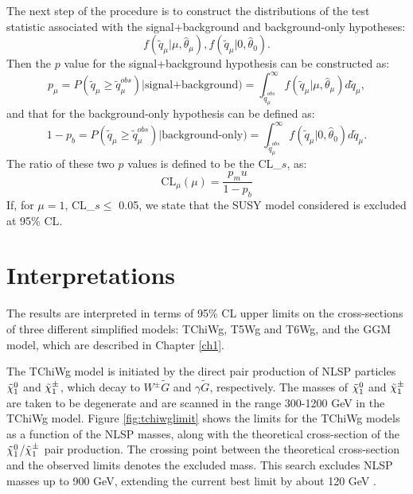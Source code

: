 \documentclass[thesis.tex]{subfiles}
\renewcommand\_{\textunderscore\allowbreak}
\begin{document}
The next step of the procedure is to construct the distributions of the test statistic associated with the signal+background and background-only hypotheses: 
\begin{equation}
	f( \tilde{q}_\mu | \mu, \hat{\theta}_\mu), f( \tilde{q}_\mu | 0, \hat{\theta}_0).
\end{equation}
Then the $p$ value for the signal+background hypothesis can be constructed as:
\begin{equation}
	p_\mu = P( \tilde{q}_\mu \ge \tilde{q}_\mu^{obs}) | \text{signal+background}) = \int_{ \tilde{q}_\mu^{obs}}^\infty f( \tilde{q}_\mu | \mu, \hat{\theta}_\mu) d \tilde{q}_\mu,
\end{equation}
and that for the background-only hypothesis can be defined as:
\begin{equation}
	1- p_b = P( \tilde{q}_\mu \ge \tilde{q}_\mu^{obs}) | \text{background-only}) = \int_{ \tilde{q}_\mu^{obs}}^\infty f( \tilde{q}_\mu | 0, \hat{\theta}_0) d \tilde{q}_\mu. 
\end{equation}
The ratio of these two $p$ values is defined to be the CL_$s$, as:
\begin{equation}
	\text{CL}_\mu(\mu) = \frac{p_mu}{1-p_b}
\end{equation}
If, for $\mu = 1$, CL_$s \le $ 0.05, we state that the SUSY model considered is excluded at 95\% CL. 


\section{Interpretations}

The results are interpreted in terms of 95\% CL upper limits on the cross-sections of three different simplified models: TChiWg, T5Wg and T6Wg, and the GGM model, which are described in Chapter \ref{ch1}. 

The TChiWg model is initiated by the direct pair production of NLSP particles $\tilde{\chi}_1^0$ and $\tilde{\chi}_1^\pm$, which decay to $W^\pm\tilde{G}$ and $\gamma\tilde{G}$, respectively.
The masses of $\tilde{\chi}_1^0$ and $\tilde{\chi}_1^\pm$ are taken to be degenerate and are scanned in the range 300-1200 GeV in the TChiWg model.  
Figure \ref{fig:tchiwglimit} shows the limits for the TChiWg models as a function of the NLSP masses, along with the theoretical cross-section of the $\tilde{\chi}_1^0$/$\tilde{\chi}_1^\pm$ pair production.
The crossing point between the theoretical cross-section and the observed limits denotes the excluded mass. 
This search excludes NLSP masses up to 900 GeV, extending the current best limit by about 120 GeV \cite{}.
\end{document}
